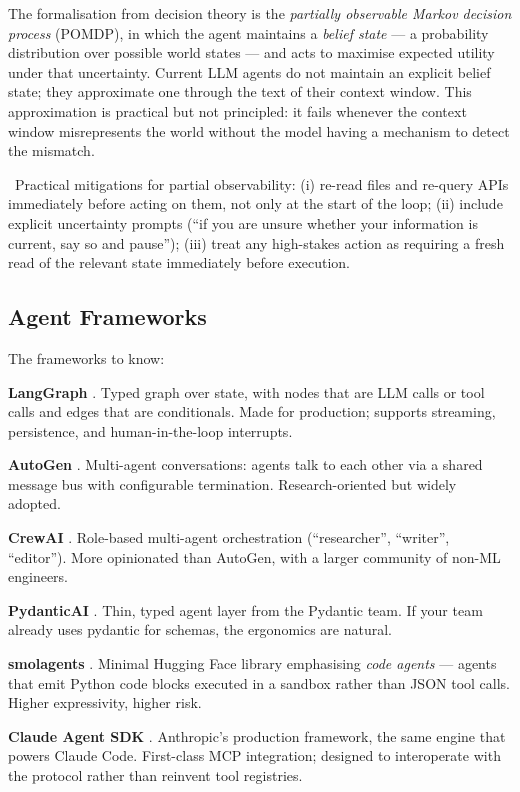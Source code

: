 The formalisation from decision theory is the
\emph{partially observable Markov decision process} (POMDP),
in which the agent maintains a \emph{belief state} --- a
probability distribution over possible world states --- and
acts to maximise expected utility under that uncertainty. Current
LLM agents do not maintain an explicit belief state; they
approximate one through the text of their context window. This
approximation is practical but not principled: it fails whenever
the context window misrepresents the world without the model
having a mechanism to detect the mismatch.

\Cons\ Practical mitigations for partial observability:
(i) re-read files and re-query APIs immediately before acting on
them, not only at the start of the loop; (ii) include explicit
uncertainty prompts (``if you are unsure whether your information
is current, say so and pause''); (iii) treat any high-stakes
action as requiring a fresh read of the relevant state
immediately before execution.

\subsection{Agent Frameworks}

The frameworks to know:

\textbf{LangGraph} \citep{langgraph_docs}. Typed graph over
state, with nodes that are LLM calls or tool calls and edges
that are conditionals. Made for production; supports streaming,
persistence, and human-in-the-loop interrupts.

\textbf{AutoGen} \citep{wu2023autogen}. Multi-agent
conversations: agents talk to each other via a shared message
bus with configurable termination. Research-oriented but widely
adopted.

\textbf{CrewAI} \citep{crewai_docs}. Role-based multi-agent
orchestration (``researcher'', ``writer'', ``editor''). More
opinionated than AutoGen, with a larger community of non-ML
engineers.

\textbf{PydanticAI} \citep{pydantic_ai_docs}. Thin, typed agent
layer from the Pydantic team. If your team already uses pydantic
for schemas, the ergonomics are natural.

\textbf{smolagents} \citep{smolagents_docs}. Minimal Hugging Face
library emphasising \emph{code agents} --- agents that emit
Python code blocks executed in a sandbox rather than JSON tool
calls. Higher expressivity, higher risk.

\textbf{Claude Agent SDK} \citep{anthropic_agent_sdk}. Anthropic's
production framework, the same engine that powers Claude Code.
First-class MCP integration; designed to interoperate with the
protocol rather than reinvent tool registries.

